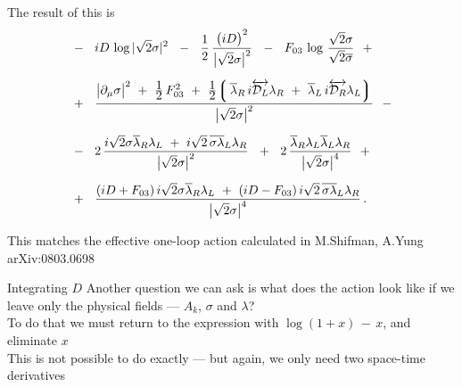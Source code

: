 \documentclass{beamer}
\begin{document}
\begin{frame}{}

	The result of this is 
\begin{align*}
%
\notag
	&     
	~~-~~ iD\, \log |\sqrt{2}\sigma|^2  ~~-~~  \frac{1}{2}\, \frac{ \big(i D\big)^2 } { \big|\sqrt{2}\sigma\big|^2 }
	~~-~~ F_{03}\, \log\, \frac{\sqrt{2}\sigma}{\sqrt{2}\ov\sigma}
	~~+~~
	\\[2mm]
%
\notag
	&
	~~+~~ \frac{
		\big|\p_\mu \sigma\big|^2  ~+~  \frac{\displaystyle 1}{\displaystyle 2}\,F_{03}^2  ~+~
		\frac{\displaystyle 1}{\displaystyle 2}\!
			    \lgr\, \ov\lambda{}_R\, i\overleftrightarrow{\md_L} \lambda_R  ~+~ 
				   \ov\lambda{}_L\, i\overleftrightarrow{\md_R} \lambda_L \rgr
		} { \big|\sqrt{2}\sigma\big|^2 }
	~~-~~
	\\[2mm]
%
\notag
	&
	~~-~~ 2\,\frac{
			i\sqrt{2}\sigma\ov\lambda{}_R\lambda_L  ~+~  
			i\sqrt{2}\,\ov{\sigma\lambda}{}_L\lambda_R
		} { \big|\sqrt{2}\sigma\big|^2 }
	~~+~~ 2\, \frac{
			\ov\lambda{}_R \lambda_L \ov\lambda{}_L \lambda_R
		} { \big|\sqrt{2}\sigma\big|^4 }
	~~+~~
	\\[2mm]
%
\notag
	&
	~~+~~
	\frac{	(iD + F_{03})\, i\sqrt{2}\sigma \ov\lambda{}_R\lambda_L ~+~
		(iD - F_{03})\, i\sqrt{2}\,\ov{\sigma \lambda}{}_L\lambda_R  }
		{ \big|\sqrt{2}\sigma\big|^4 }\,.
\end{align*}

	This matches the effective one-loop action calculated in {\sc M.Shifman, A.Yung arXiv:0803.0698}
\end{frame}


\begin{frame}{Integrating $ D $}
	Another question we can ask is what does the action look like if 
	we leave only the physical fields --- $ A_k $, $ \sigma $ and $ \lambda $?\\[4mm]

	To do that we must return to the expression with $ \log(1 + x) \,-\, x $,
	and eliminate $ x $\\[4mm]

	This is not possible to do exactly --- but again, we only need two 
	space-time derivatives
\end{frame}
\end{document}
